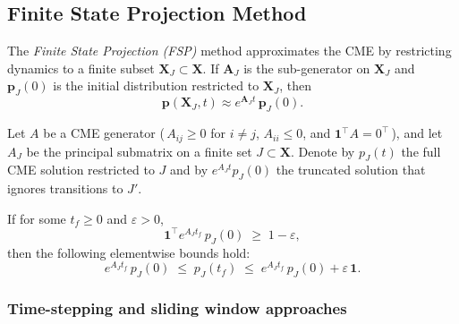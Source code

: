 \documentclass[review,onefignum,onetabnum]{siamart171218}
\begin{document}
\subsection{Finite State Projection Method}

\begin{definition}
The \textit{Finite State Projection (FSP)} method approximates the CME by restricting dynamics to a finite subset $\mathbf{X}_J\subset\mathbf{X}$. If $\mathbf{A}_J$ is the sub-generator on $\mathbf{X}_J$ and $\boldsymbol{p}_J(0)$ is the initial distribution restricted to $\mathbf{X}_J$, then
\begin{equation}
    \boldsymbol{p}(\mathbf{X}_J, t) \approx e^{\mathbf{A}_J t}\, \boldsymbol{p}_J(0).
\end{equation}
\end{definition}

\begin{theorem}
\label{thm:classical_fsp}
Let $A$ be a CME generator (\,$A_{ij}\ge 0$ for $i\neq j$, $A_{ii}\le 0$, and $\mathbf{1}^\top A=0^\top$\,), and let $A_J$ be the principal submatrix on a finite set $J\subset \mathbf{X}$. Denote by $p_J(t)$ the full CME solution restricted to $J$ and by $e^{A_J t}p_J(0)$ the truncated solution that ignores transitions to $J'$.

If for some $t_f\ge 0$ and $\varepsilon>0$,
\begin{equation}
\mathbf{1}^\top e^{A_J t_f}\,p_J(0) \;\ge\; 1-\varepsilon,
\label{eq:fsp-mass-cond}
\end{equation}
then the following elementwise bounds hold:
\begin{equation}
e^{A_J t_f}\,p_J(0) \;\le\; p_J(t_f) \;\le\; e^{A_J t_f}\,p_J(0) + \varepsilon\,\mathbf{1}.
\label{eq:fsp-elementwise}
\end{equation}
\end{theorem}

\subsubsection{Time-stepping and sliding window approaches}
\end{document}
